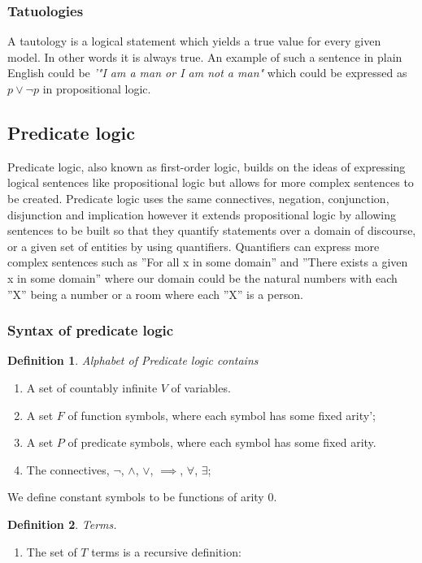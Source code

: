 \documentclass{article}%
\newtheorem{definition}{Definition}
\begin{document}
\subsubsection{Tatuologies}
A tautology is a logical statement which yields a true value for every given model. In other words it is always true. An example of such a sentence in plain English could be \textit{'"I am a man or I am not a man"} which could be expressed as $p \lor \neg{p}$ in propositional logic.

\subsection{Predicate logic}

Predicate logic, also known as first-order logic, builds on the ideas of expressing logical sentences like propositional logic but allows for more complex sentences to be created. Predicate logic uses the same connectives, negation, conjunction, disjunction and implication however it extends propositional logic by allowing sentences to be built so that they quantify statements over a domain of discourse, or a given set of entities by using quantifiers. Quantifiers can express more complex sentences such as ”For all x in some domain” and ”There exists a given x in some domain” where our domain could be the natural numbers with each ”X” being a number or a room where each ”X” is a person.

\subsubsection{Syntax of predicate logic}
\begin{definition}
Alphabet of Predicate logic contains 
\end{definition}
\begin{enumerate}
\item A set of countably infinite $V$ of variables. 
\item A set $F$ of function symbols, where each symbol has some fixed arity';
\item A set $P$ of predicate symbols, where each symbol has some fixed arity. 
\item The connectives, $\neg$, $\land$, $\lor$, $\implies$, $\forall$, $\exists$;
\end{enumerate}
We define constant symbols to be functions of arity 0. 
\begin{definition}
Terms. 
\end{definition}
\begin{enumerate}
\item The set of $T$ terms is a recursive definition: 
\end{enumerate}
\end{document}
